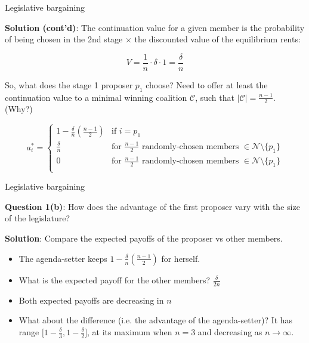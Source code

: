 \documentclass[11pt,aspectratio=169]{beamer}
\begin{document}
\begin{frame}{Legislative bargaining}

\textbf{Solution (cont'd)}: The continuation value for a given member is the probability of being chosen in the 2nd stage $\times$ the discounted value of the equilibrium rents:

$$ V = \frac{1}{n} \cdot \delta \cdot 1 = \frac{\delta}{n}$$

So, what does the stage 1 proposer $p_1$ choose? \pause Need to offer at least the continuation value to a minimal winning coalition $\mathcal{C}$, such that $|\mathcal{C}| = \frac{n-1}{2}$. (\alert{Why?}) \pause 

\[
a_i^* = 
\begin{cases}
1 - \frac{\delta}{n} \left( \frac{n-1}{2} \right) & \text{if } i = p_1 \\
\frac{\delta}{n} & \text{for } \frac{n-1}{2} \text{ randomly-chosen members } \in \mathcal{N}\setminus{\{p_1\}} \\
0 & \text{for } \frac{n-1}{2} \text{ randomly-chosen members } \in \mathcal{N}\setminus{\{p_1\}}  \\

\end{cases}
\]


\end{frame}
\begin{frame}{Legislative bargaining}

\textbf{Question 1(b)}: How does the advantage of the first proposer vary with the size of the legislature? \pause

\textbf{Solution}: Compare the expected payoffs of the proposer vs other members. \pause 
\begin{itemize}
\item The agenda-setter keeps $1 - \frac{\delta}{n} \left( \frac{n-1}{2} \right)$ for herself. \pause 
\item What is the expected payoff for the other members? \pause $\frac{\delta}{2n}$ \pause 
\item Both expected payoffs are decreasing in $n$ \pause 
\item What about the difference (i.e. the advantage of the agenda-setter)? \pause It has range $ \lbrack 1 - \frac{\delta}{3}, 1 - \frac{\delta}{2} \rbrack $, at its maximum when $n=3$ and decreasing as $n \rightarrow \infty$.

\end{itemize}


\end{frame}
\end{document}
